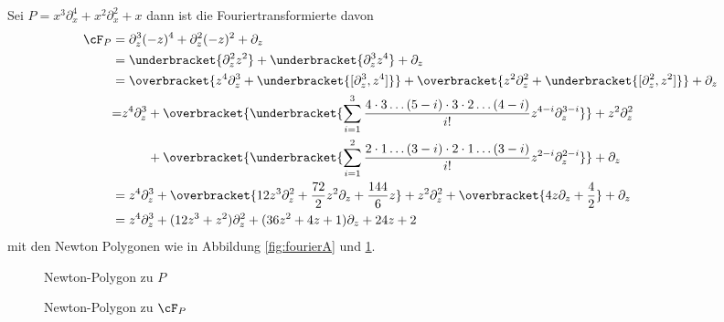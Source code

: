 \begin{exmp}
Sei $P=x^3\partial_x^4+x^2\partial_x^2+x$ dann ist die Fouriertransformierte
davon
\begin{align*}
\cF_P&=\partial_z^3(-z)^4+\partial_z^2(-z)^2+\partial_z
\\&=\underbracket{\partial_z^2z^2} + \underbracket{\partial_z^3z^4}+\partial_z
\\&=\overbracket{z^4\partial_z^3 + \underbracket{[\partial_z^3,z^4]}}
  + \overbracket{z^2\partial_z^2 + \underbracket{[\partial_z^2,z^2]}}
  + \partial_z
\\&\begin{aligned}
  =&z^4\partial_z^3 + \overbracket{\underbracket{
    \sum_{i=1}^3\frac{4\cdot3\dots(5-i)\cdot 3 \cdot 2  \dots
    (4-i)}{i!}z^{4-i}\partial_z^{3-i}
  }} + z^2\partial_z^2
\\&\qquad+ \overbracket{\underbracket{
    \sum_{i=1}^2\frac{2\cdot1\dots(3-i)\cdot 2 \cdot 1  \dots
    (3-i)}{i!}z^{2-i}\partial_z^{2-i}
  }}
  + \partial_z
\end{aligned}
\\&=z^4\partial_z^3 + \overbracket{
    12z^3\partial_z^2 + \frac{72}{2}z^2\partial_z + \frac{144}{6}z
  }
  + z^2\partial_z^2 + \overbracket{ 4z\partial_z + \frac{4}{2} } + \partial_z
\\&=z^4\partial_z^3
  + (12z^3 + z^2)\partial_z^2
  + (36z^2 + 4z + 1)\partial_z
  + 24z + 2
\end{align*}
mit den Newton Polygonen wie in Abbildung \ref{fig:fourierA} und
\ref{fig:fourierB}.
\begin{figure}[htbp]
  \begin{minipage}[hbt]{0,49\textwidth}
  \begin{center}
  \end{center}
  \caption{Newton-Polygon zu $P$}
    \label{fig:fourierA}
  \end{minipage}
  \begin{minipage}[hbt]{0,49\textwidth}
  \begin{center}
  \end{center}
  \caption{Newton-Polygon zu $\cF_P$}
    \label{fig:fourierB}
  \end{minipage}
\end{figure}
\end{exmp}

